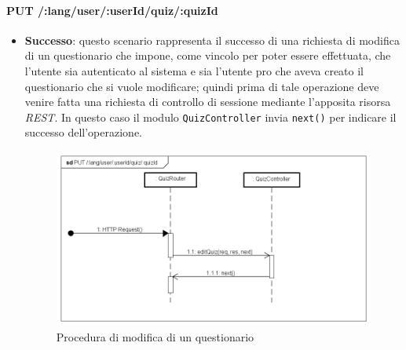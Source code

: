 \paragraph{PUT /:lang/user/:userId/quiz/:quizId} %
\begin{itemize}
\item \textbf{Successo}: questo scenario rappresenta il successo di una richiesta di modifica di un questionario che impone, come vincolo per poter essere effettuata, che l'utente sia autenticato al sistema e sia l'utente pro che aveva creato il questionario che si vuole modificare; quindi prima di tale operazione deve venire fatta una richiesta di controllo di sessione mediante l'apposita risorsa \textit{REST}. In questo caso il modulo \texttt{QuizController} invia \texttt{next()} per indicare il successo dell'operazione.
\label{Procedura di modifica di un questionario}
\begin{figure}[ht]
	\centering
	\includegraphics[scale=0.50]{UML/DiagrammiDiSequenza/Back-end/PUT__lang_user_userId_quiz_quizId_success.png}
	\caption{Procedura di modifica di un questionario}
\end{figure}
\FloatBarrier


\end{itemize}
